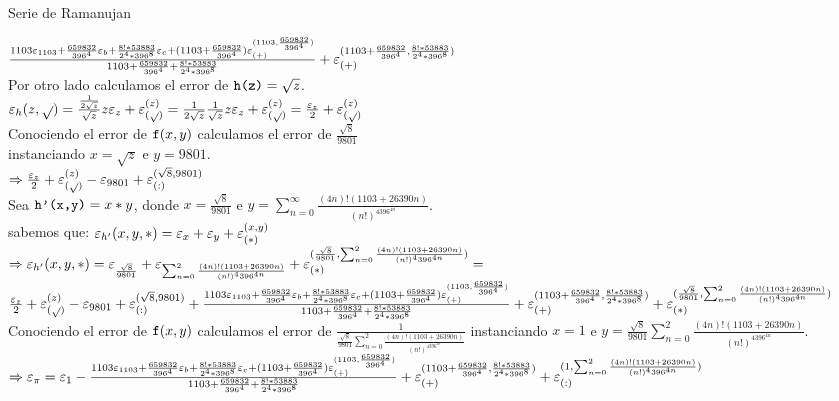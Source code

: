 \begin{subsection}{Serie de Ramanujan}
	\VSP
	
	$\frac{1103\varepsilon _{1103}+\frac{659832}{396^4}\varepsilon _{b} + \frac{8!*53883}{2^4*396^8}\varepsilon _{c} + (1103+\frac{659832}{396^4})\varepsilon _{({+})}^{({1103,\frac{659832}{396^4}})}}{1103+\frac{659832}{396^4}+\frac{8!*53883}{2^4*396^8}} + \varepsilon _{({+})}^{({1103+\frac{659832}{396^4},\frac{8!*53883}{2^4*396^8}})}$\\
	
	Por otro lado calculamos el error de $\texttt{h(z)}=\sqrt{z}$.\\
	
	$\varepsilon _{h}({z,\sqrt{ }}) = \frac{\frac{1}{2\sqrt{z}}}{\sqrt{z}}z\varepsilon _{z} + \varepsilon _{({\sqrt{ }})}^{({z})} = \frac{1}{2\sqrt{z}}\frac{1}{\sqrt{z}}z\varepsilon _{z} + \varepsilon _{({\sqrt{ }})}^{({z})} = \frac{\varepsilon _{z}}{2} + \varepsilon _{({\sqrt{ }})}^{({z})}$\\
	
	Conociendo el error de $\texttt{f}(x,y)$ calculamos el error de $\frac{\sqrt{8}}{9801}$\\ instanciando $x=\sqrt{z}$ e $y=9801$.\\
	
	$\Rightarrow \frac{\varepsilon _{z}}{2} + \varepsilon _{({\sqrt{ }})}^{({z})} - \varepsilon _{9801} + \varepsilon _{({:})}^{({\sqrt{8},9801})}$\\
	
	Sea $\texttt{h'(x,y)}=x*y$, donde $x=\frac{\sqrt{8}}{9801}$ e $y=\sum_{n=0}^{\infty}{\frac{(4n)!(1103+26390n)}{(n!)^4396^{4n}}}$.\\
	
	sabemos que: $\varepsilon _{h'}({x,y,*}) = \varepsilon _{x} + \varepsilon _{y} + \varepsilon _{({*})}^{({x,y})}$\\
	
	$\Rightarrow \varepsilon _{h'}({x,y,*}) = \varepsilon _{\frac{\sqrt{8}}{9801}} + \varepsilon _{\sum_{n=0}^{2}{\frac{(4n)!(1103+26390n)}{(n!)^4396^{4n}}}} + \varepsilon _{({*})}^{({\frac{\sqrt{8}}{9801},\sum_{n=0}^{2}{\frac{(4n)!(1103+26390n)}{(n!)^4396^{4n}}}})} = $\\
	
	$\frac{\varepsilon _{z}}{2}+\varepsilon _{({\sqrt{}})}^{({z})}-\varepsilon _{9801}+\varepsilon _{({:})}^{({\sqrt{8},9801})}+\frac{1103\varepsilon _{1103}+\frac{659832}{396^4}\varepsilon _{b}+ \frac{8!*53883}{2^4*396^8}\varepsilon _{c}+(1103+\frac{659832}{396^4})\varepsilon _{({+})}^{({1103,\frac{659832}{396^4}})}}{1103+\frac{659832}{396^4} +\frac{8!*53883}{2^4*396^8}} + \varepsilon _{({+})}^{({1103+\frac{659832}{396^4},\frac{8!*53883}{2^4*396^8}})} + \varepsilon _{({*})}^{({\frac{\sqrt{8}}{9801},\sum_{n=0}^{2}{\frac{(4n)!(1103+26390n)}{(n!)^4396^{4n}}}})}$\\
	
	Conociendo el error de $\texttt{f}(x,y)$ calculamos el error de $\frac{1}{\frac{\sqrt{8}}{9801}\sum_{n=0}^{2}{\frac{(4n)!(1103+26390n)}{(n!)^4396^{4n}}}}$ instanciando $x=1$ e $y=\frac{\sqrt{8}}{9801}\sum_{n=0}^{2}{\frac{(4n)!(1103+26390n)}{(n!)^4396^{4n}}}$.\\
	
	$\Rightarrow \varepsilon _{\pi}=\varepsilon _{1} - \frac{1103\varepsilon _{1103}+\frac{659832}{396^4}\varepsilon _{b} + \frac{8!*53883}{2^4*396^8}\varepsilon _{c} + (1103+\frac{659832}{396^4})\varepsilon _{({+})}^{({1103,\frac{659832}{396^4}})}}{1103+\frac{659832}{396^4}+\frac{8!*53883}{2^4*396^8}} + \varepsilon _{({+})}^{({1103+\frac{659832}{396^4},\frac{8!*53883}{2^4*396^8}})} + \varepsilon _{({:})}^{({1,\sum_{n=0}^{2}{\frac{(4n)!(1103+26390n)}{(n!)^4396^{4n}}}})}$\\
	
\end{subsection}
